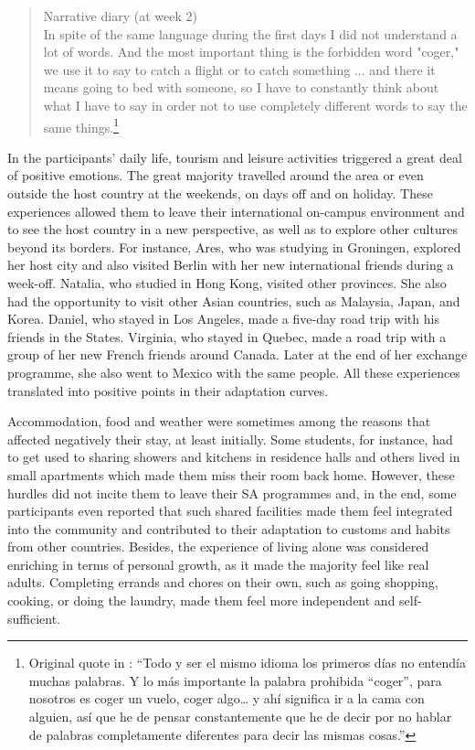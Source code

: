 \documentclass[output=paper]{langsci/langscibook}
\begin{document}
\begin{quote}
Narrative diary (at week 2)
\smallskip\\
 In spite of the same language during the first days I did not understand a lot of words. And the most important thing is the forbidden word "coger," we use it to say to catch a flight or to catch something ... and there it means going to bed with someone, so I have to constantly think about what I have to say in order not to use completely different words to say the same things.\footnote{Original quote in : “Todo y ser el mismo idioma los primeros días no entendía muchas palabras. Y lo más importante la palabra prohibida “coger”, para nosotros es coger un vuelo, coger algo… y ahí significa ir a la cama con alguien, así que he de pensar constantemente que he de decir por no hablar de palabras completamente diferentes para decir las mismas cosas.”}
\end{quote}

In the participants’ daily life, tourism and leisure activities triggered a great deal of positive emotions. The great majority travelled around the area or even outside the host country at the weekends, on days off and on holiday. These experiences allowed them to leave their international on-campus environment and to see the host country in a new perspective, as well as to explore other cultures beyond its borders. For instance, Ares, who was studying in Groningen, explored her host city and also visited Berlin with her new international friends during a week-off. Natalia, who studied in Hong Kong, visited other  provinces. She also had the opportunity to visit other Asian countries, such as Malaysia, Japan, and Korea. Daniel, who stayed in Los Angeles, made a five-day road trip with his  friends in the States. Virginia, who stayed in Quebec, made a road trip with a group of her new French friends around Canada. Later at the end of her exchange programme, she also went to Mexico with the same people. All these experiences translated into positive  points in their adaptation curves. 

Accommodation, food and weather were sometimes among the reasons that affected negatively their stay, at least initially. Some students, for instance, had to get used to sharing showers and kitchens in residence halls and others lived in small apartments which made them miss their room back home. However, these hurdles did not incite them to leave their SA programmes and, in the end, some participants even reported that such shared facilities made them feel integrated into the community and contributed to their adaptation to customs and habits from other countries. Besides, the experience of living alone was considered enriching in terms of personal growth, as it made the majority feel like real adults. Completing errands and chores on their own, such as going shopping, cooking, or doing the laundry, made them feel more independent and self-sufficient. 
\end{document}
